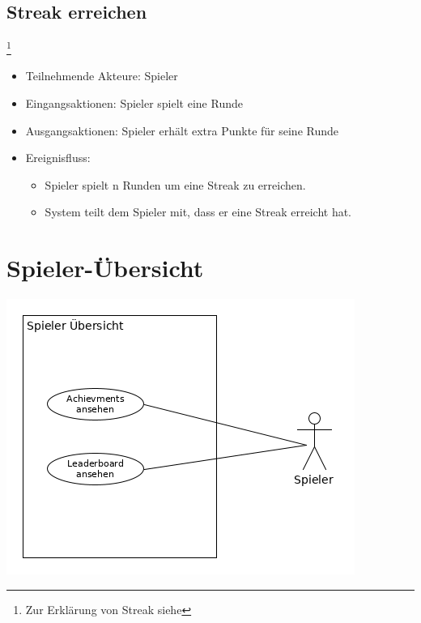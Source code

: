 \documentclass[a4paper]{scrreprt}
\begin{document}
    \subsection{Streak erreichen}\footnote{Zur Erklärung von Streak siehe }
    \begin{itemize}
        \item Teilnehmende Akteure: \Gls{Spieler}
        \item Eingangsaktionen: \Gls{Spieler} spielt eine Runde
        \item Ausgangsaktionen: \Gls{Spieler} erhält extra Punkte für seine Runde
        \item Ereignisfluss:
        \begin{itemize}
            \item \Gls{Spieler} spielt n Runden um eine Streak zu erreichen.
            \item System teilt dem \Gls{Spieler} mit, dass er eine Streak erreicht hat.
        \end{itemize}
    \end{itemize}
    
\newpage
    \section{Spieler-Übersicht}
    \includegraphics[width=\textwidth]{uml/export/Spieler_Ubersicht.png}
\end{document}
